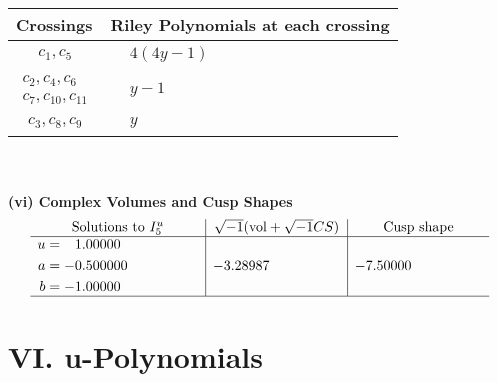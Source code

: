 \documentclass[1p]{elsarticle_modified}
\theoremstyle{definition}
\newcommand{\I}{\sqrt{-1}}
\begin{document}
\begin{tabular}{m{50pt}|m{274pt}}
Crossings & \hspace{64pt}Riley Polynomials at each crossing \\
\hline $$\begin{aligned}c_{1},c_{5}\end{aligned}$$&$\begin{aligned}
&4(4 y-1)
\end{aligned}$\\
\hline $$\begin{aligned}c_{2},c_{4},c_{6}\\c_{7},c_{10},c_{11}\end{aligned}$$&$\begin{aligned}
&y-1
\end{aligned}$\\
\hline $$\begin{aligned}c_{3},c_{8},c_{9}\end{aligned}$$&$\begin{aligned}
&y
\end{aligned}$\\
\hline
\end{tabular}\\~\\
\newpage\flushleft \textbf{(vi) Complex Volumes and Cusp Shapes}
$$\begin{array}{c|c|c}  
\text{Solutions to }I^u_{5}& \I (\text{vol} + \sqrt{-1}CS) & \text{Cusp shape}\\
 \hline 
\begin{aligned}
u &= \phantom{-}1.00000\phantom{ +0.000000I} \\
a &= -0.500000\phantom{ +0.000000I} \\
b &= -1.00000\phantom{ +0.000000I}\end{aligned}
 & -3.28987\phantom{ +0.000000I} & -7.50000\phantom{ +0.000000I}\\
 \hline 
 \end{array}$$\newpage
\newpage\renewcommand{\arraystretch}{1}
\centering \section*{ VI. u-Polynomials}
\end{document}
